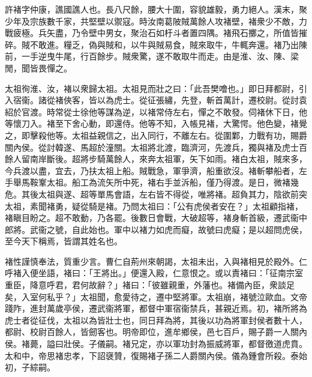 \begin{pinyinscope}
 
 
 許褚字仲康，譙國譙人也。長八尺餘，腰大十圍，容貌雄毅，勇力絕人。漢末，聚少年及宗族數千家，共堅壁以禦寇。時汝南葛陂賊萬餘人攻褚壁，褚衆少不敵，力戰疲極。兵矢盡，乃令壁中男女，聚治石如杅斗者置四隅。褚飛石擲之，所值皆摧碎。賊不敢進。糧乏，偽與賊和，以牛與賊易食，賊來取牛，牛輒奔還。褚乃出陳前，一手逆曳牛尾，行百餘步。賊衆驚，遂不敢取牛而走。由是淮、汝、陳、梁閒，聞皆畏憚之。
 
 
 
 
 太祖徇淮、汝，褚以衆歸太祖。太祖見而壯之曰：「此吾樊噲也。」即日拜都尉，引入宿衞。諸從褚俠客，皆以為虎士。從征張繡，先登，斬首萬計，遷校尉。從討袁紹於官渡。時常從士徐他等謀為逆，以褚常侍左右，憚之不敢發。伺褚休下日，他等懷刀入。褚至下舍心動，即還侍。他等不知，入帳見褚，大驚愕。他色變，褚覺之，即擊殺他等。太祖益親信之，出入同行，不離左右。從圍鄴，力戰有功，賜爵關內侯。從討韓遂、馬超於潼關。太祖將北渡，臨濟河，先渡兵，獨與褚及虎士百餘人留南岸斷後。超將步騎萬餘人，來奔太祖軍，矢下如雨。褚白太祖，賊來多，今兵渡以盡，宜去，乃扶太祖上船。賊戰急，軍爭濟，船重欲沒。褚斬攀船者，左手舉馬鞍鞌太祖。船工為流矢所中死，褚右手並泝船，僅乃得渡。是日，微褚幾危。其後太祖與遂、超等單馬會語，左右皆不得從，唯將褚。超負其力，陰欲前突太祖，素聞褚勇，疑從騎是褚。乃問太祖曰：「公有虎侯者安在？」太祖顧指褚，褚瞋目盼之。超不敢動，乃各罷。後數日會戰，大破超等，褚身斬首級，遷武衞中郎將。武衞之號，自此始也。軍中以褚力如虎而癡，故號曰虎癡；是以超問虎侯，至今天下稱焉，皆謂其姓名也。
 
 
 
 
 褚性謹慎奉法，質重少言。曹仁自荊州來朝謁，太祖未出，入與褚相見於殿外。仁呼褚入便坐語，褚曰：「王將出。」便還入殿，仁意恨之。或以責褚曰：「征南宗室重臣，降意呼君，君何故辭？」褚曰：「彼雖親重，外藩也。褚備內臣，衆談足矣，入室何私乎？」太祖聞，愈愛待之，遷中堅將軍。太祖崩，褚號泣歐血。文帝踐阼，進封萬歲亭侯，遷武衞將軍，都督中軍宿衞禁兵，甚親近焉。初，褚所將為虎士者從征伐，太祖以為皆壯士也，同日拜為將，其後以功為將軍封侯者數十人，都尉、校尉百餘人，皆劒客也。明帝即位，進牟鄉侯，邑七百戶，賜子爵一人關內侯。褚薨，謚曰壯侯。子儀嗣。褚兄定，亦以軍功封為振威將軍，都督徼道虎賁。太和中，帝思褚忠孝，下詔襃贊，復賜褚子孫二人爵關內侯。儀為鍾會所殺。泰始初，子綜嗣。
 
 
\end{pinyinscope}